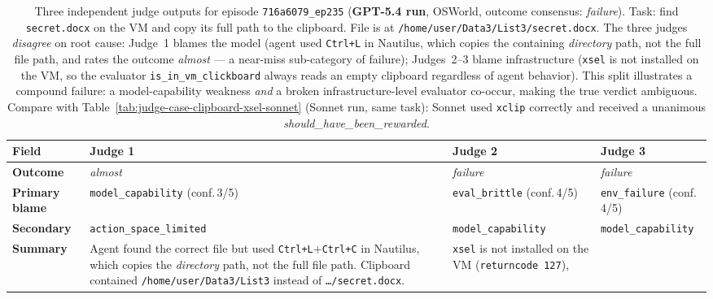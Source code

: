 \documentclass{article}
\begin{document}
\begin{table}[t]
\centering
\caption{%
  Three independent judge outputs for episode \texttt{716a6079\_ep235}
  (\textbf{GPT-5.4 run}, OSWorld, outcome consensus: \emph{failure}).
  Task: find \texttt{secret.docx} on the VM and copy its full path to the
  clipboard. File is at \texttt{/home/user/Data3/List3/secret.docx}.
  The three judges \emph{disagree} on root cause: Judge~1 blames the model
  (agent used \texttt{Ctrl+L} in Nautilus, which copies the containing
  \emph{directory} path, not the full file path, and rates the outcome
  \emph{almost} --- a near-miss sub-category of failure); Judges~2--3 blame
  infrastructure (\texttt{xsel} is not installed on the VM, so the evaluator
  \texttt{is\_in\_vm\_clickboard} always reads an empty clipboard regardless
  of agent behavior). This split illustrates a compound failure: a
  model-capability weakness \emph{and} a broken infrastructure-level
  evaluator co-occur, making the true verdict ambiguous.
  Compare with Table~\ref{tab:judge-case-clipboard-xsel-sonnet} (Sonnet run,
  same task): Sonnet used \texttt{xclip} correctly and received a unanimous
  \emph{should\_have\_been\_rewarded}.
}
\label{tab:judge-case-clipboard-xsel-gpt4}
\scriptsize
\setlength{\tabcolsep}{4pt}
\renewcommand{\arraystretch}{1.4}
\begin{tabularx}{\linewidth}{@{} >{\bfseries\RaggedRight}p{2.2cm}
                                  >{\RaggedRight\arraybackslash}X
                                  >{\RaggedRight\arraybackslash}X
                                  >{\RaggedRight\arraybackslash}X @{}}
\toprule
Field & Judge 1 & Judge 2 & Judge 3 \\
\midrule
\rowcolor{rowgray}
Outcome & \emph{almost} & \emph{failure} & \emph{failure} \\
Primary blame
  & \texttt{model\_capability} (conf.\,3/5)
  & \texttt{eval\_brittle} (conf.\,4/5)
  & \texttt{env\_failure} (conf.\,4/5) \\
\rowcolor{rowgray}
Secondary & \texttt{action\_space\_limited} & \texttt{model\_capability} & \texttt{model\_capability} \\
Summary
  & Agent found the correct file but used \texttt{Ctrl+L}+\texttt{Ctrl+C}
    in Nautilus, which copies the \emph{directory} path, not the full
    file path. Clipboard contained \texttt{/home/user/Data3/List3}
    instead of \texttt{\ldots/secret.docx}.
  & \texttt{xsel} is not installed on the VM (\texttt{returncode~127}),

\end{tabularx}
\end{table}
\end{document}
